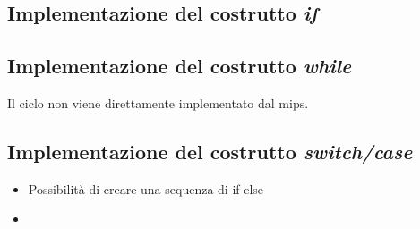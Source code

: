 \documentclass[class=book, crop=false]{standalone}
\begin{document}

\subsection{Implementazione del costrutto \emph{if}}

\subsection{Implementazione del costrutto \emph{while}}
Il ciclo non viene direttamente implementato dal mips.\\

\subsection{Implementazione del costrutto \emph{switch/case}}
\begin{itemize}
	\item Possibilità di creare una sequenza di if-else
	\item
\end{itemize}
\end{document}
